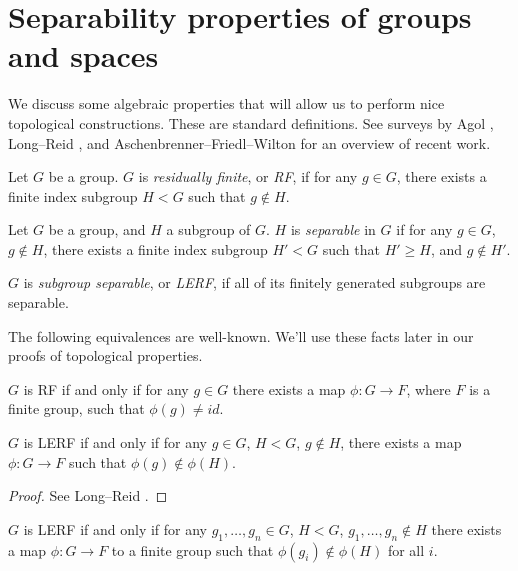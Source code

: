 \section{Separability properties of groups and spaces}

We discuss some algebraic properties that will allow us to perform nice
topological constructions. These are standard definitions. See surveys by Agol
\cite{Agolsurvey}, Long--Reid \cite{LR}, and Aschenbrenner--Friedl--Wilton
\cite{AFW} for an overview of recent work.

\begin{defn}

Let $G$ be a group. $G$ is \emph{residually finite}, or \emph{RF}, if for any
$g \in G$, there exists a finite index subgroup $H<G$ such that $g \notin H$.

Let $G$ be a group, and $H$ a subgroup of $G$. $H$ is \emph{separable} in $G$
if for any $g \in G$, $g \notin H$, there exists a finite index subgroup $H'<G$
such that $H' \geq H$, and $g \notin H'$.

$G$ is \emph{subgroup separable}, or \emph{LERF}, if all of its finitely
generated subgroups are separable.

\end{defn}

The following equivalences are well-known.  We'll use these facts later in our
proofs of topological properties.

\begin{prop}\label{P:lerfmap}

$G$ is RF if and only if for any $g \in G$ there exists a map $\phi \colon
G \to F$, where $F$ is a finite group, such that $\phi(g) \neq id$.

$G$ is LERF if and only if for any $g \in G$, $H < G$, $g \notin H$, there
exists a map $\phi \colon G \to F$ such that $\phi(g) \notin \phi(H)$.

\end{prop}

\begin{proof}

See Long--Reid \cite[pp17]{LR}.

\end{proof}

\begin{cor}\label{C:lerfmap'}

$G$ is LERF if and only if for any $g_1,\dots,g_n \in G$, $H<G$, $g_1,\dots,g_n
\notin H$ there exists a map $\phi \colon G \to F$ to a finite group such that
$\phi(g_i) \notin \phi(H)$ for all $i$.

\end{cor}

